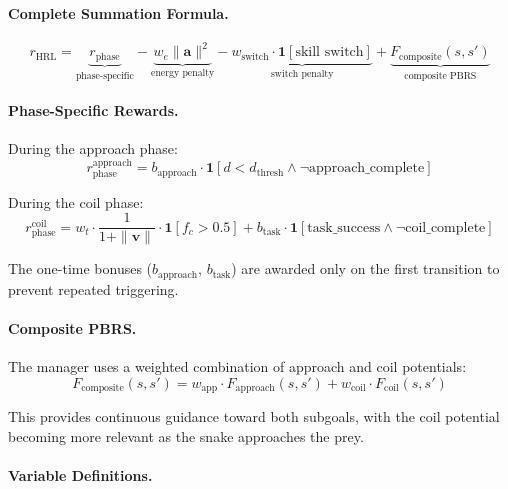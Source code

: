 \documentclass[11pt]{article}
\begin{document}
\paragraph{Complete Summation Formula.}
\begin{equation}
    r_{\text{HRL}} = \underbrace{r_{\text{phase}}}_{\text{phase-specific}}
    - \underbrace{w_e \|\mathbf{a}\|^2}_{\text{energy penalty}}
    - \underbrace{w_{\text{switch}} \cdot \mathbf{1}[\text{skill switch}]}_{\text{switch penalty}}
    + \underbrace{F_{\text{composite}}(s, s')}_{\text{composite PBRS}}
\end{equation}

\paragraph{Phase-Specific Rewards.}

During the approach phase:
\begin{equation}
    r_{\text{phase}}^{\text{approach}} = b_{\text{approach}} \cdot \mathbf{1}[d < d_{\text{thresh}} \land \neg \text{approach\_complete}]
\end{equation}

During the coil phase:
\begin{equation}
    r_{\text{phase}}^{\text{coil}} = w_t \cdot \frac{1}{1 + \|\mathbf{v}\|} \cdot \mathbf{1}[f_c > 0.5] + b_{\text{task}} \cdot \mathbf{1}[\text{task\_success} \land \neg \text{coil\_complete}]
\end{equation}

The one-time bonuses ($b_{\text{approach}}$, $b_{\text{task}}$) are awarded only on the first transition to prevent repeated triggering.

\paragraph{Composite PBRS.}
The manager uses a weighted combination of approach and coil potentials:
\begin{equation}
    F_{\text{composite}}(s, s') = w_{\text{app}} \cdot F_{\text{approach}}(s, s') + w_{\text{coil}} \cdot F_{\text{coil}}(s, s')
\end{equation}

This provides continuous guidance toward both subgoals, with the coil potential becoming more relevant as the snake approaches the prey.

\paragraph{Variable Definitions.}
\end{document}
